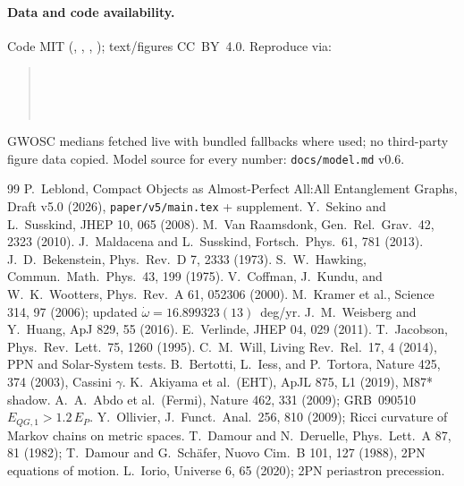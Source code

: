 \documentclass[11pt]{article}
\begin{document}
\paragraph{Data and code availability.}
Code MIT (, , , ); text/figures CC~BY~4.0. Reproduce via:
\begin{quote}\small
{}\\
\\
\\
\end{quote}
GWOSC medians fetched live with bundled fallbacks where used; no third-party figure data copied. Model source for every number: \texttt{docs/model.md} v0.6.

\begin{thebibliography}{99}
 P.~Leblond, Compact Objects as Almost-Perfect All:All Entanglement Graphs, Draft v5.0 (2026), \texttt{paper/v5/main.tex} + supplement.
 Y.~Sekino and L.~Susskind, JHEP 10, 065 (2008).
 M.~Van Raamsdonk, Gen.\ Rel.\ Grav.\ 42, 2323 (2010).
 J.~Maldacena and L.~Susskind, Fortsch.\ Phys.\ 61, 781 (2013).
 J.~D.~Bekenstein, Phys.\ Rev.\ D 7, 2333 (1973).
 S.~W.~Hawking, Commun.\ Math.\ Phys.\ 43, 199 (1975).
 V.~Coffman, J.~Kundu, and W.~K.~Wootters, Phys.\ Rev.\ A 61, 052306 (2000).
 M.~Kramer et al., Science 314, 97 (2006); updated $\dot\omega = 16.899323(13)$~deg/yr.
 J.~M.~Weisberg and Y.~Huang, ApJ 829, 55 (2016).
 E.~Verlinde, JHEP 04, 029 (2011).
 T.~Jacobson, Phys.\ Rev.\ Lett.\ 75, 1260 (1995).
 C.~M.~Will, Living Rev.\ Rel.\ 17, 4 (2014), PPN and Solar-System tests.
 B.~Bertotti, L.~Iess, and P.~Tortora, Nature 425, 374 (2003), Cassini $\gamma$.
 K.~Akiyama et al.\ (EHT), ApJL 875, L1 (2019), M87* shadow.
 A.~A.~Abdo et al.\ (Fermi), Nature 462, 331 (2009); GRB~090510 $E_{QG,1} > 1.2\,E_P$.
 Y.~Ollivier, J.\ Funct.\ Anal.\ 256, 810 (2009); Ricci curvature of Markov chains on metric spaces.
 T.~Damour and N.~Deruelle, Phys.\ Lett.\ A 87, 81 (1982); T.~Damour and G.~Sch\"afer, Nuovo Cim.\ B 101, 127 (1988), 2PN equations of motion.
 L.~Iorio, Universe 6, 65 (2020); 2PN periastron precession.
\end{thebibliography}
\end{document}

